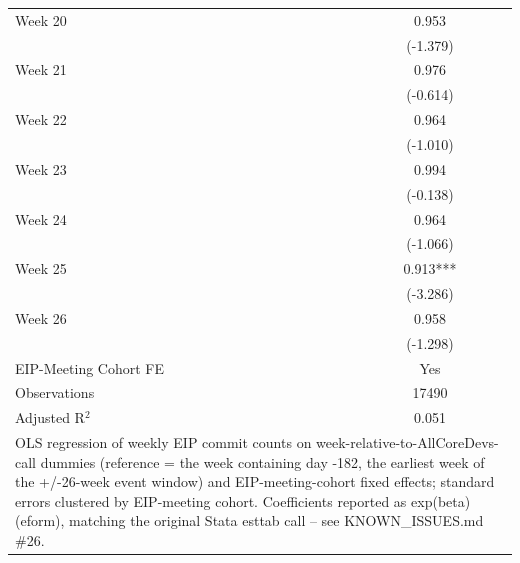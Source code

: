 \begin{tabular}{lc}
Week 20 & 0.953 \\
 & (-1.379) \\
Week 21 & 0.976 \\
 & (-0.614) \\
Week 22 & 0.964 \\
 & (-1.010) \\
Week 23 & 0.994 \\
 & (-0.138) \\
Week 24 & 0.964 \\
 & (-1.066) \\
Week 25 & 0.913*** \\
 & (-3.286) \\
Week 26 & 0.958 \\
 & (-1.298) \\
\midrule
EIP-Meeting Cohort FE & Yes \\
\midrule
Observations & 17490 \\
Adjusted R$^2$ & 0.051 \\
\bottomrule
\multicolumn{2}{l}{\footnotesize OLS regression of weekly EIP commit counts on week-relative-to-AllCoreDevs-call dummies (reference = the week containing day -182, the earliest week of the +/-26-week event window) and EIP-meeting-cohort fixed effects; standard errors clustered by EIP-meeting cohort. Coefficients reported as exp(beta) (eform), matching the original Stata esttab call -- see KNOWN\_ISSUES.md \#26.} \\
\end{tabular}
